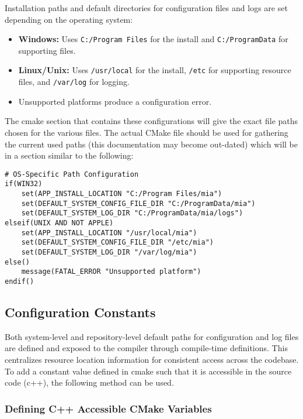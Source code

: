 Installation paths and default directories for configuration files and logs are set depending on the operating system:
\begin{itemize}
	\item \textbf{Windows:} Uses \texttt{C:/Program Files} for the install and \texttt{C:/ProgramData} for supporting files.
	\item \textbf{Linux/Unix:} Uses \texttt{/usr/local} for the install, \texttt{/etc} for supporting resource files, and \texttt{/var/log} for logging.
	\item Unsupported platforms produce a configuration error.
\end{itemize}
The cmake section that contains these configurations will give the exact file paths chosen for the various files. The actual CMake file should be used for gathering the current used paths (this documentation may become out-dated) which will be in a section similar to the following:
\begin{lstlisting}[style=shellstyle]
# OS-Specific Path Configuration
if(WIN32)
    set(APP_INSTALL_LOCATION "C:/Program Files/mia")
    set(DEFAULT_SYSTEM_CONFIG_FILE_DIR "C:/ProgramData/mia")
    set(DEFAULT_SYSTEM_LOG_DIR "C:/ProgramData/mia/logs")
elseif(UNIX AND NOT APPLE)
    set(APP_INSTALL_LOCATION "/usr/local/mia")
    set(DEFAULT_SYSTEM_CONFIG_FILE_DIR "/etc/mia")
    set(DEFAULT_SYSTEM_LOG_DIR "/var/log/mia")
else()
    message(FATAL_ERROR "Unsupported platform")
endif()
\end{lstlisting}

\subsection{Configuration Constants}

Both system-level and repository-level default paths for configuration and log files are defined and exposed to the compiler through compile-time definitions. This centralizes resource location information for consistent access across the codebase. To add a constant value defined in cmake such that it is accessible in the source code (c++), the following method can be used.

\subsubsection{Defining C++ Accessible CMake Variables}
\label{sec:CMake-setup-cpp}

